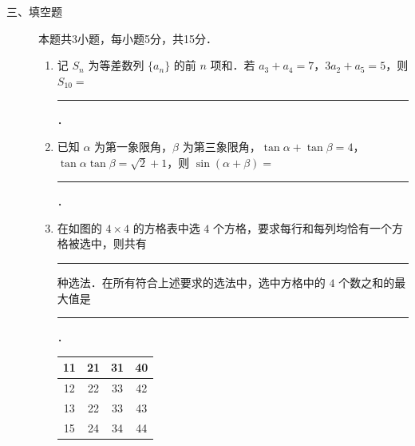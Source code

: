 \begin{description}
    \item[三、填空题] 本题共3小题，每小题5分，共15分．
    \begin{enumerate}[leftmargin=5pt]
      \addtocounter{enumi}{+11}
        \item 记 $S_n$ 为等差数列 $\{a_n\}$ 的前 $n$ 项和．若 $a_3+a_4=7$，$3a_2+a_5=5$，则 $S_{10}=$ \rule[-0.3ex]{3em}{0.4pt}．
        \item 已知 $\alpha$ 为第一象限角，$\beta$ 为第三象限角，$\tan\alpha+\tan\beta=4$，$\tan\alpha\tan\beta=\sqrt{2}+1$，则 $\sin(\alpha+\beta)=$ \rule[-0.3ex]{3em}{0.4pt}．
        \item 在如图的 $4\times4$ 的方格表中选 $4$ 个方格，要求每行和每列均恰有一个方格被选中，则共有 \rule[-0.3ex]{3em}{0.4pt} 种选法．在所有符合上述要求的选法中，选中方格中的 $4$ 个数之和的最大值是 \rule[-0.3ex]{3em}{0.4pt}．

        {\centering\begin{tabular}{c|c|c|c}
        \hline
        11 & 21 & 31 & 40 \\
        \hline
        12 & 22 & 33 & 42 \\
        \hline
        13 & 22 & 33 & 43 \\
        \hline
        15 & 24 & 34 & 44 \\
        \hline
        \end{tabular}\par}
    \end{enumerate}
\end{description}

